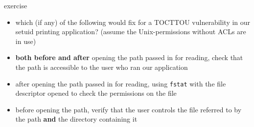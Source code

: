 \begin{frame}{exercise}
    \begin{itemize}
    \item which (if any) of the following would fix for a TOCTTOU vulnerability in our setuid printing application?
        (assume the Unix-permissions without ACLs are in use)
    \vspace{.5cm}
    \item\relax[A] \textbf{both before and after} opening the path passed in for reading, check that the path is accessible to the user who ran our application
    \item\relax[B] after opening the path passed in for reading, using \texttt{fstat} with the file descriptor opened to check the permissions on the file
    \item\relax[C] before opening the path, verify that the user controls the file referred to by the path \textbf{and} the directory containing it
    \end{itemize}
\end{frame}
